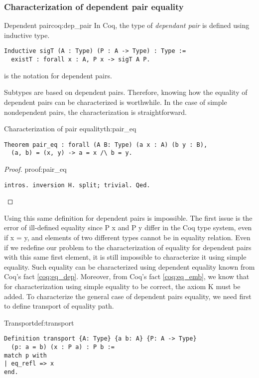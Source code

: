 \subsubsection{Characterization of dependent pair equality}
\begin{coq}{Dependent pair}{coq:dep_pair}
In Coq, the type of \emph{dependant pair} is defined using inductive type.
\begin{verbatim}
Inductive sigT (A : Type) (P : A -> Type) : Type :=
  existT : forall x : A, P x -> sigT A P.
\end{verbatim}
 is the notation for dependent pairs.
\end{coq}
Subtypes are based on dependent pairs. Therefore, knowing how the equality of dependent pairs can be characterized is worthwhile. In the case of simple nondependent pairs, the characterization is straightforward.
\begin{theo}{Characterization of pair equality}{th:pair_eq}
\begin{verbatim}
Theorem pair_eq : forall (A B: Type) (a x : A) (b y : B),
  (a, b) = (x, y) -> a = x /\ b = y.
\end{verbatim}
\end{theo}
\begin{proof}{}{proof:pair_eq}
\begin{verbatim}
intros. inversion H. split; trivial. Qed.
\end{verbatim}
\end{proof}
Using this same definition for dependent pairs is impossible. The first issue is the error of ill-defined equality since P x and P y differ in the Coq type system, even if x = y, and elements of two different types cannot be in equality relation. Even if we redefine our problem to the characterization of equality for dependent pairs with this same first element, it is still impossible to characterize it using simple equality. Such equality can be characterized using dependent equality known from Coq's fact \ref{coq:eq_dep}. Moreover, from Coq's fact \ref{coq:eq_emb}, we know that for characterization using simple equality to be correct, the axiom K must be added. To characterize the general case of dependent pairs equality, we need first to define transport of equality path.
\begin{defi}{Transport}{def:transport}
\begin{verbatim}
Definition transport {A: Type} {a b: A} {P: A -> Type} 
  (p: a = b) (x : P a) : P b :=
match p with
| eq_refl => x
end.
\end{verbatim}
\end{defi}
